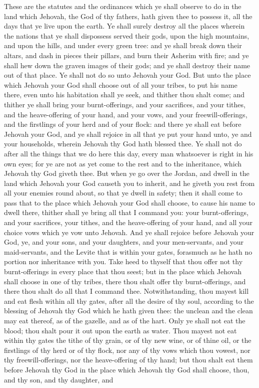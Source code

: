These are the statutes and the ordinances which ye shall observe to do in the land which Jehovah, the God of thy fathers, hath given thee to possess it, all the days that ye live upon the earth. Ye shall surely destroy all the places wherein the nations that ye shall dispossess served their gods, upon the high mountains, and upon the hills, and under every green tree: and ye shall break down their altars, and dash in pieces their pillars, and burn their Asherim with fire; and ye shall hew down the graven images of their gods; and ye shall destroy their name out of that place. Ye shall not do so unto Jehovah your God. But unto the place which Jehovah your God shall choose out of all your tribes, to put his name there, even unto his habitation shall ye seek, and thither thou shalt come; and thither ye shall bring your burnt-offerings, and your sacrifices, and your tithes, and the heave-offering of your hand, and your vows, and your freewill-offerings, and the firstlings of your herd and of your flock: and there ye shall eat before Jehovah your God, and ye shall rejoice in all that ye put your hand unto, ye and your households, wherein Jehovah thy God hath blessed thee. Ye shall not do after all the things that we do here this day, every man whatsoever is right in his own eyes; for ye are not as yet come to the rest and to the inheritance, which Jehovah thy God giveth thee. But when ye go over the Jordan, and dwell in the land which Jehovah your God causeth you to inherit, and he giveth you rest from all your enemies round about, so that ye dwell in safety; then it shall come to pass that to the place which Jehovah your God shall choose, to cause his name to dwell there, thither shall ye bring all that I command you: your burnt-offerings, and your sacrifices, your tithes, and the heave-offering of your hand, and all your choice vows which ye vow unto Jehovah. And ye shall rejoice before Jehovah your God, ye, and your sons, and your daughters, and your men-servants, and your maid-servants, and the Levite that is within your gates, forasmuch as he hath no portion nor inheritance with you. Take heed to thyself that thou offer not thy burnt-offerings in every place that thou seest; but in the place which Jehovah shall choose in one of thy tribes, there thou shalt offer thy burnt-offerings, and there thou shalt do all that I command thee.  Notwithstanding, thou mayest kill and eat flesh within all thy gates, after all the desire of thy soul, according to the blessing of Jehovah thy God which he hath given thee: the unclean and the clean may eat thereof, as of the gazelle, and as of the hart. Only ye shall not eat the blood; thou shalt pour it out upon the earth as water. Thou mayest not eat within thy gates the tithe of thy grain, or of thy new wine, or of thine oil, or the firstlings of thy herd or of thy flock, nor any of thy vows which thou vowest, nor thy freewill-offerings, nor the heave-offering of thy hand; but thou shalt eat them before Jehovah thy God in the place which Jehovah thy God shall choose, thou, and thy son, and thy daughter, and 